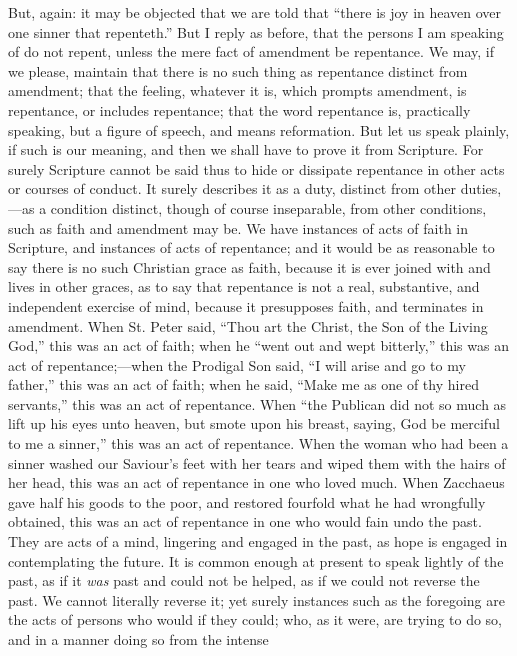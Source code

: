But, again: it may be objected that we are told that ``there is
joy in heaven over one sinner that repenteth.'' But I reply as
before, that the persons I am speaking of do not repent, unless the
mere fact of amendment be repentance. We may, if we please, maintain
that there is no such thing as repentance distinct from amendment;
that the feeling, whatever it is, which prompts amendment, is
repentance, or includes repentance; that the word repentance is,
practically speaking, but a figure of speech, and means reformation.
But let us speak plainly, if such is our meaning, and then we shall
have to prove it from Scripture. For surely Scripture cannot be said
thus to hide or dissipate repentance in other acts or courses of
conduct. It surely describes it as a duty, distinct from other duties,—as
a condition distinct, though of course inseparable, from other
conditions, such as faith and amendment may be. We have instances of
acts of faith in Scripture, and instances of acts of repentance; and
it would be as reasonable to say there is no such Christian grace as
faith, because it is ever joined with and lives in other graces, as to
say that repentance is not a real, substantive, and independent
exercise of mind, because it presupposes faith, and terminates in
amendment. When St. Peter said, ``Thou art the Christ, the Son of
the Living God,'' this was an act of faith; when he ``went out
and wept bitterly,'' this was an act of repentance;—when the
Prodigal Son said, ``I will arise and go to my father,'' this
was an act of faith; when he said, ``Make me as one of thy hired
servants,'' this was an act of repentance. When ``the Publican
did not so much as lift up his eyes unto heaven, but smote upon his
breast, saying, God be merciful to me a sinner,'' this was an act
of repentance. When the woman who had been a sinner washed our
Saviour's feet with her tears and wiped them with the hairs of her
head, this was an act of repentance in one who loved much. When
Zacchaeus gave half his goods to the poor, and restored fourfold what
he had wrongfully obtained, this was an act of repentance in one who
would fain undo the past. They are acts of a mind, lingering and
engaged in the past, as hope is engaged in contemplating the future.
It is common enough at present to speak lightly of the past, as if it \emph{was}
past and could not be helped, as if we could not reverse the past. We
cannot literally reverse it; yet surely instances such as the
foregoing are the acts of persons who would if they could; who, as it
were, are trying to do so, and in a manner doing so from the intense
